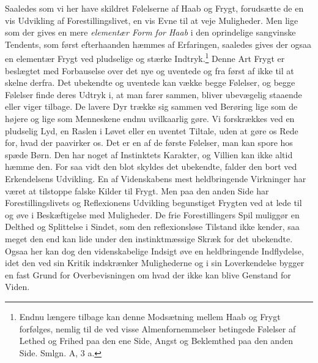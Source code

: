 \documentclass[12pt,a4paper,openany]{book}
\newcommand{\opage}[1]{\marginnote{\footnotesize\textit{[#1]}}}
\begin{document}
Saaledes som vi her have skildret Følelserne af Haab og Frygt,
forudsætte de en vis Udvikling af Forestillingslivet, en vis Evne til at
veje Muligheder. Men lige som der gives en mere \emph{elementær Form for
Haab} i den oprindelige sangvinske Tendents, som først efterhaanden
hæmmes af Erfaringen, saaledes gives der ogsaa en elementær Frygt ved
pludselige og stærke Indtryk.\footnote[3]{Endnu længere tilbage kan
denne Modsætning mellem Haab og Frygt forfølges, nemlig til de ved visse
Almenfornemmelser betingede Følelser af Lethed og Frihed paa den ene
Side, Angst og Beklemthed paa den anden Side. Smlgn. A, 3 a.} Denne Art
Frygt er beslægtet med Forbauselse over det nye og uventede og fra først
af ikke til at skelne derfra. Det ubekendte og uventede kan vække begge
Følelser, og begge Følelser finde deres Udtryk i, at man farer sammen,
bliver ubevægelig staaende eller viger tilbage. De lavere Dyr trække sig
sammen ved Berøring lige som de højere og lige som Menneskene endnu
uvilkaarlig gøre. Vi forskrækkes ved en pludselig Lyd, en Raslen i Løvet
eller en uventet Tiltale, uden at gøre os Rede for, hvad der paavirker
os. Det er en af de første Følelser, man kan spore hos spæde Børn. Den
har noget af Instinktets Karakter, og Villien kan ikke altid hæmme den.
For saa vidt den blot skyldes det ubekendte, falder den bort ved
Erkendelsens Udvikling. En af Videnskabens mest heldbringende Virkninger
har været at tilstoppe falske Kilder til Frygt. Men paa den anden Side
har Forestillingslivets og Reflexionens Udvikling
\opage{287}begunstiget Frygten ved at lede til og øve i Beskæftigelse
med Muligheder. De frie Forestillingers Spil muliggør en Delthed og
Splittelse i Sindet, som den reflexionsløse Tilstand ikke kender, saa
meget den end kan lide under den instinktmæssige Skræk for det
ubekendte. Ogsaa her kan dog den videnskabelige Indsigt øve en
heldbringende Indflydelse, idet den ved sin Kritik indskrænker
Mulighederne og i sin Loverkendelse bygger en fast Grund for
Overbevisningen om hvad der ikke kan blive Genstand for Viden.
\end{document}
